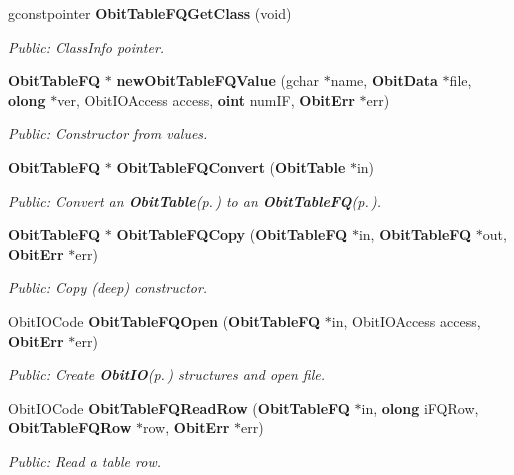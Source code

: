 \begin{CompactItemize}
gconstpointer {\bf Obit\-Table\-FQGet\-Class} (void)
\begin{CompactList}\small\item\em Public: Class\-Info pointer. \item\end{CompactList}\item 
{\bf Obit\-Table\-FQ} $\ast$ {\bf new\-Obit\-Table\-FQValue} (gchar $\ast$name, {\bf Obit\-Data} $\ast$file, {\bf olong} $\ast$ver, Obit\-IOAccess access, {\bf oint} num\-IF, {\bf Obit\-Err} $\ast$err)
\begin{CompactList}\small\item\em Public: Constructor from values. \item\end{CompactList}\item 
{\bf Obit\-Table\-FQ} $\ast$ {\bf Obit\-Table\-FQConvert} ({\bf Obit\-Table} $\ast$in)
\begin{CompactList}\small\item\em Public: Convert an {\bf Obit\-Table}{\rm (p.\,\pageref{structObitTable})} to an {\bf Obit\-Table\-FQ}{\rm (p.\,\pageref{structObitTableFQ})}. \item\end{CompactList}\item 
{\bf Obit\-Table\-FQ} $\ast$ {\bf Obit\-Table\-FQCopy} ({\bf Obit\-Table\-FQ} $\ast$in, {\bf Obit\-Table\-FQ} $\ast$out, {\bf Obit\-Err} $\ast$err)
\begin{CompactList}\small\item\em Public: Copy (deep) constructor. \item\end{CompactList}\item 
Obit\-IOCode {\bf Obit\-Table\-FQOpen} ({\bf Obit\-Table\-FQ} $\ast$in, Obit\-IOAccess access, {\bf Obit\-Err} $\ast$err)
\begin{CompactList}\small\item\em Public: Create {\bf Obit\-IO}{\rm (p.\,\pageref{structObitIO})} structures and open file. \item\end{CompactList}\item 
Obit\-IOCode {\bf Obit\-Table\-FQRead\-Row} ({\bf Obit\-Table\-FQ} $\ast$in, {\bf olong} i\-FQRow, {\bf Obit\-Table\-FQRow} $\ast$row, {\bf Obit\-Err} $\ast$err)
\begin{CompactList}\small\item\em Public: Read a table row. \item\end{CompactList}\item 

\end{CompactItemize}
